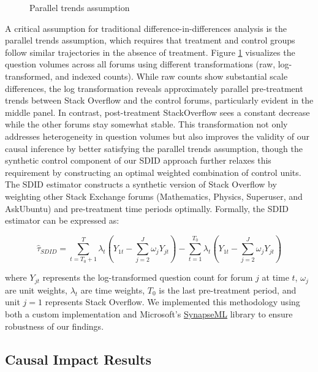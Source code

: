 \begin{figure}[htpb!]
    \centering
    
    \caption{Parallel trends assumption}
    \label{fig:transformed_trends}
\end{figure}

A critical assumption for traditional difference-in-differences analysis is the parallel trends assumption, which requires that treatment and control groups follow similar trajectories in the absence of treatment. Figure \ref{fig:transformed_trends} visualizes the question volumes across all forums using different transformations (raw, log-transformed, and indexed counts). While raw counts show substantial scale differences, the log transformation reveals approximately parallel pre-treatment trends between Stack Overflow and the control forums, particularly evident in the middle panel. In contrast, post-treatment StackOverflow sees a constant decrease while the other forums stay somewhat stable. This transformation not only addresses heterogeneity in question volumes but also improves the validity of our causal inference by better satisfying the parallel trends assumption, though the synthetic control component of our SDID approach further relaxes this requirement by constructing an optimal weighted combination of control units.\\

The SDID estimator constructs a synthetic version of Stack Overflow by weighting other Stack Exchange forums (Mathematics, Physics, Superuser, and AskUbuntu) and pre-treatment time periods optimally. Formally, the SDID estimator can be expressed as:

\begin{equation}
    \hat{\tau}_{SDID} = \sum_{t=T_0+1}^T \lambda_t \left( Y_{1t} - \sum_{j=2}^J \omega_j Y_{jt} \right) - \sum_{t=1}^{T_0} \lambda_t \left( Y_{1t} - \sum_{j=2}^J \omega_j Y_{jt} \right)
\end{equation}

where $Y_{jt}$ represents the log-transformed question count for forum $j$ at time $t$, $\omega_j$ are unit weights, $\lambda_t$ are time weights, $T_0$ is the last pre-treatment period, and unit $j=1$ represents Stack Overflow. We implemented this methodology using both a custom implementation and Microsoft's \href{https://microsoft.github.io/SynapseML/docs/Overview/}{SynapseML} library to ensure robustness of our findings.

\subsection{Causal Impact Results}

